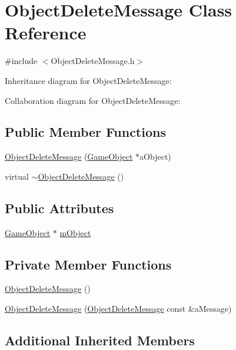 \hypertarget{classObjectDeleteMessage}{}\section{Object\+Delete\+Message Class Reference}
\label{classObjectDeleteMessage}


{\ttfamily \#include $<$Object\+Delete\+Message.\+h$>$}



Inheritance diagram for Object\+Delete\+Message\+:


Collaboration diagram for Object\+Delete\+Message\+:
\subsection*{Public Member Functions}
\begin{DoxyCompactItemize}
\item 
\hyperlink{classObjectDeleteMessage_a294daddb4dc0db633c47e0e89f80c6fc}{Object\+Delete\+Message} (\hyperlink{classGameObject}{Game\+Object} $\ast$a\+Object)
\item 
virtual \hyperlink{classObjectDeleteMessage_a16748ee2ea9bab8fb3a480af7f41fbaa}{$\sim$\+Object\+Delete\+Message} ()
\end{DoxyCompactItemize}
\subsection*{Public Attributes}
\begin{DoxyCompactItemize}
\item 
\hyperlink{classGameObject}{Game\+Object} $\ast$ \hyperlink{classObjectDeleteMessage_a6cdda4a30d791889a5e180a0f64d70cd}{m\+Object}
\end{DoxyCompactItemize}
\subsection*{Private Member Functions}
\begin{DoxyCompactItemize}
\item 
\hyperlink{classObjectDeleteMessage_a0a0e9c8e7d3ba5fe26415867c6197c62}{Object\+Delete\+Message} ()
\item 
\hyperlink{classObjectDeleteMessage_ac8578998158bcddf9d7bea7f64319c08}{Object\+Delete\+Message} (\hyperlink{classObjectDeleteMessage}{Object\+Delete\+Message} const \&a\+Message)
\end{DoxyCompactItemize}
\subsection*{Additional Inherited Members}


